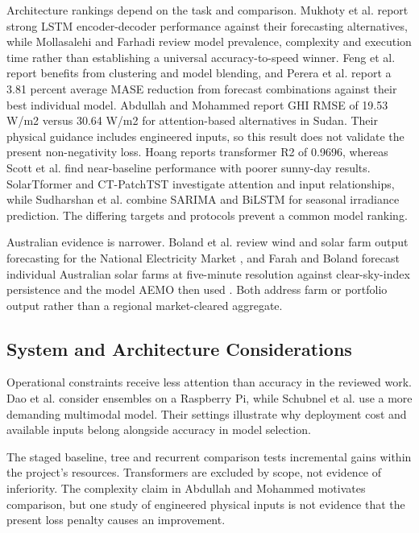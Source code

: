 Architecture rankings depend on the task and comparison. Mukhoty et al. \cite{mukhoty2019seq2seq} report strong LSTM encoder-decoder performance against their forecasting alternatives, while Mollasalehi and Farhadi \cite{mollasalehi2025review} review model prevalence, complexity and execution time rather than establishing a universal accuracy-to-speed winner. Feng et al. \cite{feng2018clustering} report benefits from clustering and model blending, and Perera et al. \cite{perera2022multires} report a 3.81 percent average MASE reduction from forecast combinations against their best individual model. Abdullah and Mohammed \cite{abdullah2026physics} report GHI RMSE of 19.53 W/m2 versus 30.64 W/m2 for attention-based alternatives in Sudan. Their physical guidance includes engineered inputs, so this result does not validate the present non-negativity loss. Hoang \cite{hoang2025efficient} reports transformer R2 of 0.9696, whereas Scott et al. \cite{scott2025transformers} find near-baseline performance with poorer sunny-day results. SolarTformer \cite{basu2026solartransformer} and CT-PatchTST \cite{lu2025ctpatchtst} investigate attention and input relationships, while Sudharshan et al. \cite{sudharshan2026spatiotemporal} combine SARIMA and BiLSTM for seasonal irradiance prediction. The differing targets and protocols prevent a common model ranking.

Australian evidence is narrower. Boland et al. review wind and solar farm output forecasting for the National Electricity Market \cite{boland2022forecasting}, and Farah and Boland forecast individual Australian solar farms at five-minute resolution against clear-sky-index persistence and the model AEMO then used \cite{farah2021time}. Both address farm or portfolio output rather than a regional market-cleared aggregate.

\subsection{System and Architecture Considerations}

Operational constraints receive less attention than accuracy in the reviewed work. Dao et al. \cite{dao2020ensemble} consider ensembles on a Raspberry Pi, while Schubnel et al. \cite{schubnel2025solarcross} use a more demanding multimodal model. Their settings illustrate why deployment cost and available inputs belong alongside accuracy in model selection.

The staged baseline, tree and recurrent comparison tests incremental gains within the project's resources. Transformers are excluded by scope, not evidence of inferiority. The complexity claim in Abdullah and Mohammed \cite{abdullah2026physics} motivates comparison, but one study of engineered physical inputs is not evidence that the present loss penalty causes an improvement.

